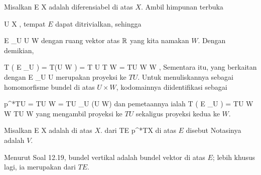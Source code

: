 {}
{

Misalkan
 { E } { X
} {}
adalah
diferensiabel di atas
$X$. Ambil himpunan terbuka

\mavergleichskette
{\vergleichskette
{ U
}
{ \subseteq }{ X
}
{  }{
}
{    }{
}
{   }{
}
}
{}{}{,}
tempat $E$ dapat ditrivialkan, sehingga

\mavergleichskette
{\vergleichskette
{ E  \vert_U
}
{ \cong }{ U \times W
}
{  }{
}
{    }{
}
{   }{
}
}
{}{}{}
dengan ruang vektor atas ${\mathbb R}$ yang kita namakan $W$. Dengan demikian,

\mavergleichskettedisp
{\vergleichskette
{ T  \left(  E \vert_U  \right)
}
{ =} { T(U \times  W )
}
{ =} { T U \times T W
}
{ =} { TU \times W \times W
}
{ } {
}
}
{}{}{,}
Sementara itu,
yang berkaitan dengan
 {E \vert_U } { U
} {}
merupakan proyeksi ke $TU$. Untuk menuliskannya sebagai homomorfisme bundel di atas $U\times W$, kodomainnya diidentifikasi sebagai

\mavergleichskettedisp
{\vergleichskette
{ p^*TU
}
{ =} { TU \times W
}
{ =} { TU \times_U (U \times W)
}
{ } {
}
{ } {
}
}
{}{}{}
dan pemetaannya ialah
\maabbdisp {} {T  \left(  E \vert_U  \right)  = TU \times W \times W  } { TU \times W
} {}
yang mengambil proyeksi ke $TU$ sekaligus proyeksi kedua ke $W$.

}

{}
{

Misalkan
 { E } { X
} {}
adalah
di atas
$X$.
dari
 {TE} {p^*TX
} {}
di atas $E$ disebut  Notasinya adalah $V$.

}

Menurut Soal 12.19, bundel vertikal adalah bundel vektor di atas $E$; lebih khusus lagi, ia merupakan
dari $TE$.




